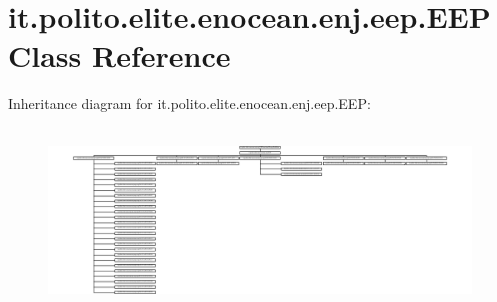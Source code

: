 \hypertarget{classit_1_1polito_1_1elite_1_1enocean_1_1enj_1_1eep_1_1_e_e_p}{}\section{it.\+polito.\+elite.\+enocean.\+enj.\+eep.\+E\+EP Class Reference}
\label{classit_1_1polito_1_1elite_1_1enocean_1_1enj_1_1eep_1_1_e_e_p}
Inheritance diagram for it.\+polito.\+elite.\+enocean.\+enj.\+eep.\+E\+EP\+:\begin{figure}[H]
\begin{center}
\leavevmode
\includegraphics[height=4.866543cm]{classit_1_1polito_1_1elite_1_1enocean_1_1enj_1_1eep_1_1_e_e_p}
\end{center}
\end{figure}
